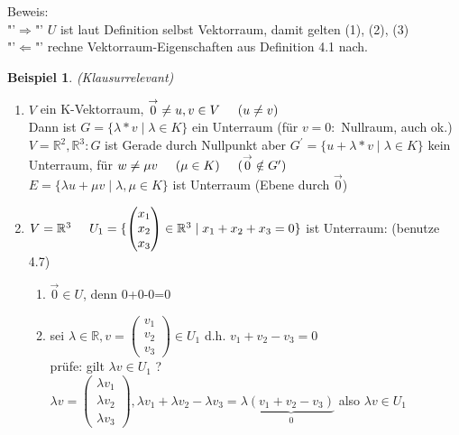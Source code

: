 \documentclass[a4paper,11pt]{article}
\newtheorem{bsp}[definition]{Beispiel}
\begin{document}
Beweis: \\
"'$\Rightarrow$"' $U$ ist laut Definition selbst Vektorraum, damit gelten (1), (2), (3) \\
"'$\Leftarrow$"' rechne Vektorraum-Eigenschaften aus Definition 4.1 nach.
\begin{bsp}
(Klausurrelevant)
\end{bsp}
\begin{enumerate}[label=\alph*)]
\item $V$ ein K-Vektorraum, $\overset{\rightarrow}{0}\neq u,v\in V\hspace{5mm}(u\neq v)$ \\
Dann ist $G=\{\lambda*v\mid\lambda\in K\}$ ein Unterraum (für $v=0:$ Nullraum, auch ok.) \\
$V=\mathbb{R}^2,\mathbb{R}^3\colon G$ ist Gerade durch Nullpunkt aber $G^{\prime}=\{u+\lambda*v\mid\lambda\in K\}$ kein Unterraum, für $w\neq\mu v\hspace{5mm}(\mu\in K)\hspace{5mm}(\overset{\rightarrow}{0}\notin G^{\prime})$ \\
$E=\{\lambda u+\mu v\mid\lambda,\mu\in K\}$ ist Unterraum (Ebene durch $\overset{\rightarrow}{0}$)
\item $V=\mathbb{R}^3\hspace{5mm}U_1=\{\begin{pmatrix}x_1\\x_2\\x_3\end{pmatrix}\in\mathbb{R}^3\mid x_1+x_2+x_3=0\}$ ist Unterraum: (benutze 4.7)
\begin{enumerate}[label=(\arabic*)]
\vspace{-5mm}
\item $\overset{\rightarrow}{0}\in U$, denn 0+0-0=0
\item sei $\lambda\in\mathbb{R}, v=\begin{pmatrix}v_1\\v_2\\v_3\end{pmatrix}\in U_1$ d.h. $v_1+v_2-v_3=0$ \\
prüfe: gilt $\lambda v\in U_1$ ? \\
$\lambda v=\begin{pmatrix}\lambda v_1\\\lambda v_2\\\lambda v_3\end{pmatrix}, \lambda v_1+\lambda v_2-\lambda v_3=\lambda\underbrace{(v_1+v_2-v_3)}_{0}$ also $\lambda v\in U_1$

\end{enumerate}
\end{enumerate}
\end{document}

